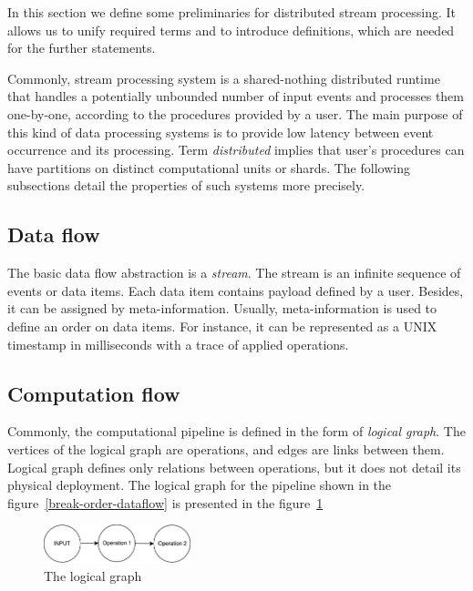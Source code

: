 
\label {fs-stream}

In this section we define some preliminaries for distributed stream processing. It allows us to unify required terms and to introduce definitions, which are needed for the further statements.

Commonly, stream processing system is a shared-nothing distributed runtime that handles a potentially unbounded number of input events and processes them one-by-one, according to the procedures provided by a user. The main purpose of this kind of data processing systems is to provide low latency between event occurrence and its processing. Term {\it distributed} implies that user's procedures can have partitions on distinct computational units or shards. The following subsections detail the properties of such systems more precisely.  

\subsection{Data flow}
The basic data flow abstraction is a {\it stream}. The stream is an infinite sequence of events or data items. Each data item contains payload defined by a user. Besides, it can be assigned by meta-information. Usually, meta-information is used to define an order on data items. For instance, it can be represented as a UNIX timestamp in milliseconds with a trace of applied operations.

\subsection{Computation flow}
Commonly, the computational pipeline is defined in the form of {\it logical graph}. The vertices of the logical graph are operations, and edges are links between them. Logical graph defines only relations between operations, but it does not detail its physical deployment. The logical graph for the pipeline shown in the figure~\ref{break-order-dataflow} is presented in the figure~\ref{break-order-dataflow-logical}

\begin{figure}[htbp]
  \centering
  \includegraphics[width=0.38\textwidth]{pics/break_order_pipeline_logical}
  \caption{The logical graph}
  \label {break-order-dataflow-logical}
\end{figure}


